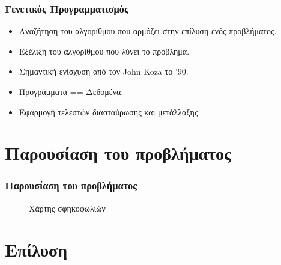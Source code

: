 \documentclass[xetex,mathserif,serif,14pt]{beamer}
\begin{document}
\begin{frame}
\frametitle{Γενετικός Προγραμματισμός}
\begin{itemize}
  \item Αναζήτηση του αλγορίθμου που αρμόζει στην επίλυση ενός προβλήματος.
  \item Εξέλιξη του αλγορίθμου που λύνει το πρόβλημα.
  \item Σημαντική ενίσχυση από τον John Koza το '90.  
  \item Προγράμματα == Δεδομένα.
  \item Εφαρμογή τελεστών διασταύρωσης και μετάλλαξης.
\end{itemize}
\end{frame}


\section{Παρουσίαση του προβλήματος}

\begin{frame}
\frametitle{Παρουσίαση του προβλήματος}
\begin{figure}[!t]
    \centering
    \caption{Χάρτης σφηκοφωλιών}
    \label{fig_waspNestsMap}
\end{figure}
\end{frame}


\section{Επίλυση}
\end{document}

